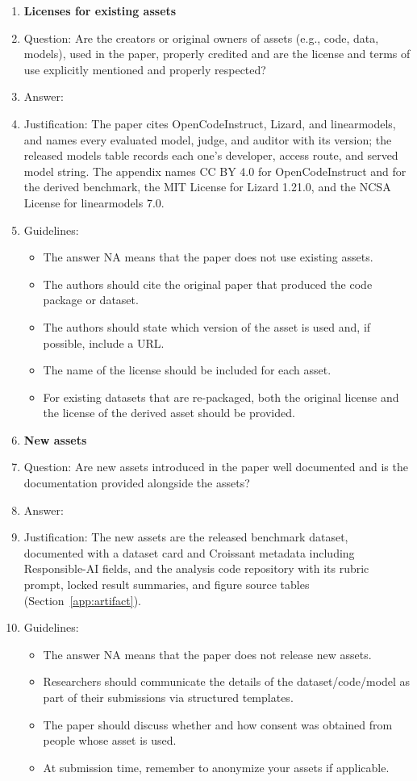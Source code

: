 \begin{enumerate}
\item {\bf Licenses for existing assets}
    \item[] Question: Are the creators or original owners of assets (e.g., code, data, models), used in the paper, properly credited and are the license and terms of use explicitly mentioned and properly respected?
    \item[] Answer: \answerYes{}
    \item[] Justification: The paper cites OpenCodeInstruct, Lizard, and linearmodels, and names every evaluated model, judge, and auditor with its version; the released models table records each one's developer, access route, and served model string. The appendix names CC BY 4.0 for OpenCodeInstruct and for the derived benchmark, the MIT License for Lizard 1.21.0, and the NCSA License for linearmodels 7.0.
    \item[] Guidelines:
    \begin{itemize}
        \item The answer NA means that the paper does not use existing assets.
        \item The authors should cite the original paper that produced the code package or dataset.
        \item The authors should state which version of the asset is used and, if possible, include a URL.
        \item The name of the license should be included for each asset.
        \item For existing datasets that are re-packaged, both the original license and the license of the derived asset should be provided.
    \end{itemize}

\item {\bf New assets}
    \item[] Question: Are new assets introduced in the paper well documented and is the documentation provided alongside the assets?
    \item[] Answer: \answerYes{}
    \item[] Justification: The new assets are the released benchmark dataset, documented with a dataset card and Croissant metadata including Responsible-AI fields, and the analysis code repository with its rubric prompt, locked result summaries, and figure source tables (Section~\ref{app:artifact}).
    \item[] Guidelines:
    \begin{itemize}
        \item The answer NA means that the paper does not release new assets.
        \item Researchers should communicate the details of the dataset/code/model as part of their submissions via structured templates.
        \item The paper should discuss whether and how consent was obtained from people whose asset is used.
        \item At submission time, remember to anonymize your assets if applicable.
    \end{itemize}


\end{enumerate}
